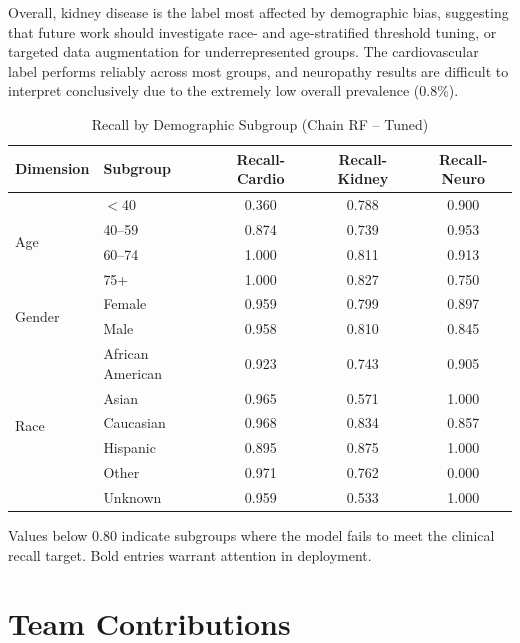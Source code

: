 \documentclass[12pt]{article}
\begin{document}
Overall, kidney disease is the label most affected by demographic bias,
suggesting that future work should investigate race- and age-stratified
threshold tuning, or targeted data augmentation for underrepresented groups.
The cardiovascular label performs reliably across most groups, and neuropathy
results are difficult to interpret conclusively due to the extremely low
overall prevalence (0.8\%).

\begin{table}[H]
  \centering
  \caption{Recall by Demographic Subgroup (Chain RF -- Tuned)}
  \label{tab:bias}
  \begin{tabular}{llccc}
    \toprule
    Dimension & Subgroup & Recall-Cardio & Recall-Kidney & Recall-Neuro \\
    \midrule
    \multirow{4}{*}{Age}
      & $<$40  & 0.360 & 0.788 & 0.900 \\
      & 40--59 & 0.874 & 0.739 & 0.953 \\
      & 60--74 & 1.000 & 0.811 & 0.913 \\
      & 75+    & 1.000 & 0.827 & 0.750 \\
    \midrule
    \multirow{2}{*}{Gender}
      & Female & 0.959 & 0.799 & 0.897 \\
      & Male   & 0.958 & 0.810 & 0.845 \\
    \midrule
    \multirow{6}{*}{Race}
      & African American & 0.923 & 0.743 & 0.905 \\
      & Asian            & 0.965 & 0.571 & 1.000 \\
      & Caucasian        & 0.968 & 0.834 & 0.857 \\
      & Hispanic         & 0.895 & 0.875 & 1.000 \\
      & Other            & 0.971 & 0.762 & 0.000 \\
      & Unknown          & 0.959 & 0.533 & 1.000 \\
    \bottomrule
  \end{tabular}
  \begin{flushleft}
  \small Values below 0.80 indicate subgroups where the model fails to meet
  the clinical recall target. Bold entries warrant attention in deployment.
  \end{flushleft}
\end{table}


\section{Team Contributions}
\end{document}
